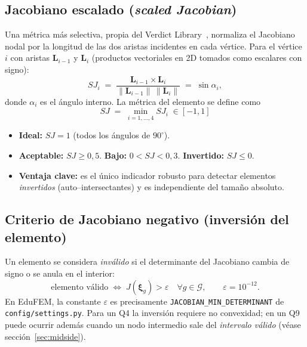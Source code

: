 \documentclass[11pt,a4paper]{article}
\begin{document}
\subsection{Jacobiano escalado (\emph{scaled Jacobian})}

Una m\'etrica m\'as selectiva, propia del Verdict Library~\cite{Verdict2007,Knupp2003}, normaliza el Jacobiano nodal por la longitud de las dos aristas incidentes en cada v\'ertice. Para el v\'ertice $i$ con aristas $\mathbf{L}_{i-1}$ y $\mathbf{L}_i$ (productos vectoriales en 2D tomados como escalares con signo):
\begin{equation}
SJ_i \;=\; \frac{\mathbf{L}_{i-1}\times\mathbf{L}_i}{\|\mathbf{L}_{i-1}\|\,\|\mathbf{L}_i\|} \;=\; \sin\alpha_i,
\label{eq:SJ_i}
\end{equation}
donde $\alpha_i$ es el \'angulo interno. La m\'etrica del elemento se define como
\begin{equation}
\boxed{\;SJ \;=\; \min_{i=1,\dots,4} SJ_i \;\in[-1,1]\;}
\label{eq:SJ}
\end{equation}
\begin{itemize}[leftmargin=1.2em]
  \item \textbf{Ideal:} $SJ = 1$ (todos los \'angulos de $90^\circ$).
  \item \textbf{Aceptable:} $SJ \ge 0{,}5$. \textbf{Bajo:} $0<SJ<0{,}3$. \textbf{Invertido:} $SJ \le 0$.
  \item \textbf{Ventaja clave:} es el \'unico indicador robusto para detectar elementos \emph{invertidos} (auto--intersectantes) y es independiente del tama\~no absoluto.
\end{itemize}

\subsection{Criterio de Jacobiano negativo (inversi\'on del elemento)}
Un elemento se considera \emph{inv\'alido} si el determinante del Jacobiano cambia de signo o se anula en el interior:
\begin{equation}
\text{elemento v\'alido} \;\iff\; J(\boldsymbol{\xi}_g) > \varepsilon \quad \forall g\in\mathcal{G},\qquad \varepsilon = 10^{-12}.
\label{eq:valid_elem}
\end{equation}
En EduFEM, la constante $\varepsilon$ es precisamente \texttt{JACOBIAN\_MIN\_DETERMINANT} de \texttt{config/settings.py}. Para un Q4 la inversi\'on requiere no convexidad; en un Q9 puede ocurrir adem\'as cuando un nodo intermedio sale del \emph{intervalo v\'alido} (v\'ease secci\'on~\ref{sec:midside}).
\end{document}
